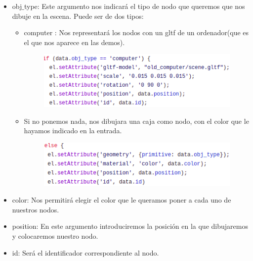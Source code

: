 \documentclass[a4paper, 12pt]{book}
\begin{document}
\begin{itemize}
    
    \item obj$\_$type: Este argumento nos indicará el tipo de nodo que queremos que nos dibuje en la escena. Puede ser de dos tipos:
    \begin{itemize}
        \item computer : Nos representará los nodos con un gltf de un ordenador(que es el que nos aparece en las demos).
        
        \begin{figure}[h]
            \centering
            \includegraphics[scale=0.7]{img/gltf_comp_node.png}
        \end{figure}
        
        \item Si no ponemos nada, nos dibujara una caja como nodo, con el color que le hayamos indicado en 	la entrada.
        
        \begin{figure}[h]
            \centering
            \includegraphics[scale=0.7]{img/box_comp_node.png}
        \end{figure}
        
    \end{itemize}
    
    \item color: Nos permitirá elegir el color que le queramos poner a cada uno de nuestros nodos.
    
    \item position: En este argumento introduciremos la posición en la que dibujaremos y colocaremos nuestro nodo.
    
    \item id: Será el identificador correspondiente al nodo.
\end{itemize}
\end{document}
